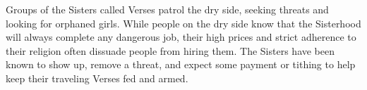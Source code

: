 Groups of the Sisters called Verses patrol the dry side, seeking threats and looking for orphaned girls.
While people on the dry side know that the Sisterhood will always complete any dangerous job, their high prices and strict adherence to their religion often dissuade people from hiring them.
The Sisters have been known to show up, remove a threat, and expect some payment or tithing to help keep their traveling Verses fed and armed.
